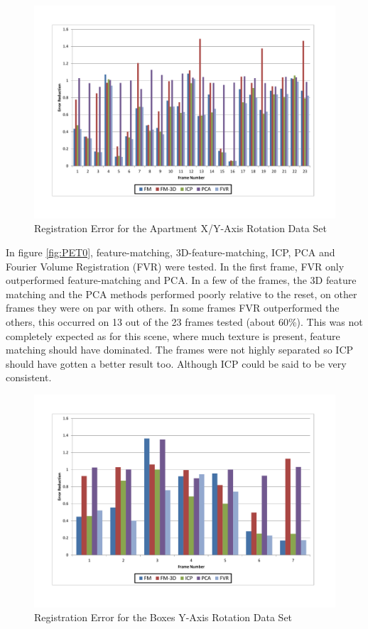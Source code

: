\begin{figure}[t]
\centering
\includegraphics[width=6.0in]{images/results/Apartment_Texture_Rotate_XAxis}
\caption{Registration Error for the Apartment X/Y-Axis Rotation Data Set}
\label{fig:PET1}
\end{figure}

In figure \ref{fig:PET0}, feature-matching, 3D-feature-matching, ICP, PCA and Fourier Volume Registration (FVR) were tested. In the first frame, FVR only outperformed feature-matching and PCA. In a few of the frames, the 3D feature matching and the PCA methods performed poorly relative to the reset, on other frames they were on par with others. In some frames FVR outperformed the others, this occurred on 13 out of the 23 frames tested (about 60\%). This was not completely expected as for this scene, where much texture is present, feature matching should have dominated. The frames were not highly separated so ICP should have gotten a better result too. Although ICP could be said to be very consistent.

\begin{figure}[t]
\centering
\includegraphics[width=6.0in]{images/results/Boxes_Texture_Rotate}
\caption{Registration Error for the Boxes Y-Axis Rotation Data Set}
\label{fig:PET2}
\end{figure}

